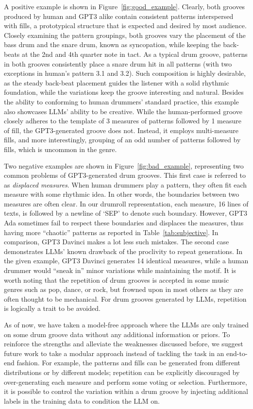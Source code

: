 \documentclass[letterpaper]{article} %
\begin{document}
A positive example is shown in Figure~\ref{fig:good_example}. Clearly, both grooves produced by human and GPT3 alike contain consistent patterns interspersed with fills, a prototypical structure that is expected and desired by most audience. Closely examining the pattern groupings, both grooves vary the placement of the bass drum and the snare drum, known as syncopation, while keeping the back-beats at the 2nd and 4th quarter note in tact. As a typical drum groove, patterns in both grooves consistently place a snare drum hit in all patterns (with two exceptions in human's pattern 3.1 and 3.2). Such composition is highly desirable, as the steady back-beat placement guides the listener with a solid rhythmic foundation, while the variations keep the groove interesting and natural. Besides the ability to conforming to human drummers' standard practice, this example also showcases LLMs' ability to be creative. While the human-performed groove closely adheres to the template of 3 measures of patterns followed by 1 measure of fill, the GPT3-generated groove does not. Instead, it employs multi-measure fills, and more interestingly, grouping of an odd number of patterns followed by fills, which is uncommon in the genre.

Two negative examples are shown in Figure~\ref{fig:bad_example}, representing two common problems of GPT3-generated drum grooves. This first case is referred to as \textit{displaced measures}. When human drummers play a pattern, they often fit each measure with some rhythmic idea. In other words, the boundaries between two measures are often clear. In our drumroll representation, each measure, 16 lines of texts, is followed by a newline of `SEP' to denote such boundary. However, GPT3 Ada sometimes fail to respect these boundaries and displaces the measures, thus having more ``chaotic'' patterns as reported in Table~\ref{tab:subjective}. In comparison, GPT3 Davinci makes a lot less such mistakes. The second case demonstrates LLMs' known drawback of the proclivity to repeat generations. In the given example, GPT3 Davinci generates 14 identical measures, while a human drummer would ``sneak in'' minor variations while maintaining the motif. It is worth noting that the repetition of drum grooves is accepted in some music genres such as pop, dance, or rock, but frowned upon in most others as they are often thought to be mechanical. For drum grooves generated by LLMs, repetition is logically a trait to be avoided.

As of now, we have taken a model-free approach where the LLMs are only trained on some drum groove data without any additional information or priors. To reinforce the strengths and alleviate the weaknesses discussed before, we suggest future work to take a modular approach instead of tackling the task in an end-to-end fashion. For example, the patterns and fills can be generated from different distributions or by different models; repetition can be explicitly discouraged by over-generating each measure and perform some voting or selection. Furthermore, it is possible to control the variation within a drum groove by injecting additional labels in the training data to condition the LLM on. 
\end{document}
